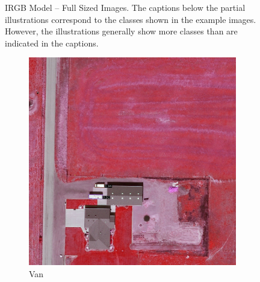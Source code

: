 \begin{figure}[h!]
    \caption[IRGB Model – Full Sized Images]{IRGB Model – Full Sized Images. The captions below the partial illustrations correspond to the classes shown in the example images. However, the illustrations generally show more classes than are indicated in the captions.}
    \label{fig:irgb_perm_exp_examples_fs}
\end{figure}


\begin{figure}[h!]
    \centering
    \begin{subfigure}[t]{0.38\textwidth}
        \centering
        \includegraphics[width=\linewidth]{images/015Results/02perm_exp/comp_images/rirb/198.png}
        \caption{Van}
    \end{subfigure}
    \begin{subfigure}[t]{0.38\textwidth}
        \centering

\end{subfigure}
\end{figure}
